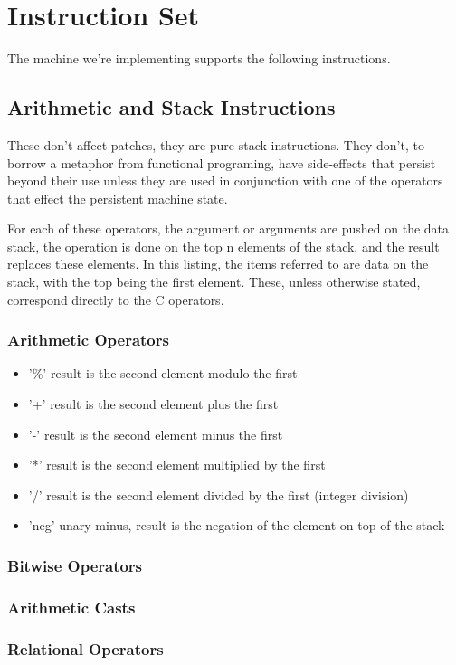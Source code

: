 \chapter{Instruction Set}
The machine we're implementing supports the following instructions.
\section{Arithmetic and Stack Instructions}
These don't affect patches, they are pure stack instructions. They don't, to borrow a metaphor from functional programing, have side-effects that persist beyond their use unless they are used in conjunction with one of the operators that effect the persistent machine state.

For each of these operators, the argument or arguments are pushed on the data stack, the operation is done on the top n elements of the stack, and the result replaces these elements. In this listing, the items referred to are data on the stack, with the top being the first element. These, unless otherwise stated, correspond directly to the C operators.
\subsection{Arithmetic Operators}
\begin{itemize}
\item '\%' result is the second element modulo the first
\item '+' result is the second element plus the first
\item '-' result is the second element minus the first
\item '*' result is the second element multiplied by the first
\item '/' result is the second element divided by the first (integer division)
\item 'neg' unary minus, result is the negation of the element on top of the stack
\end{itemize}
\subsection{Bitwise Operators}
\subsection{Arithmetic Casts}
\subsection{Relational Operators}

